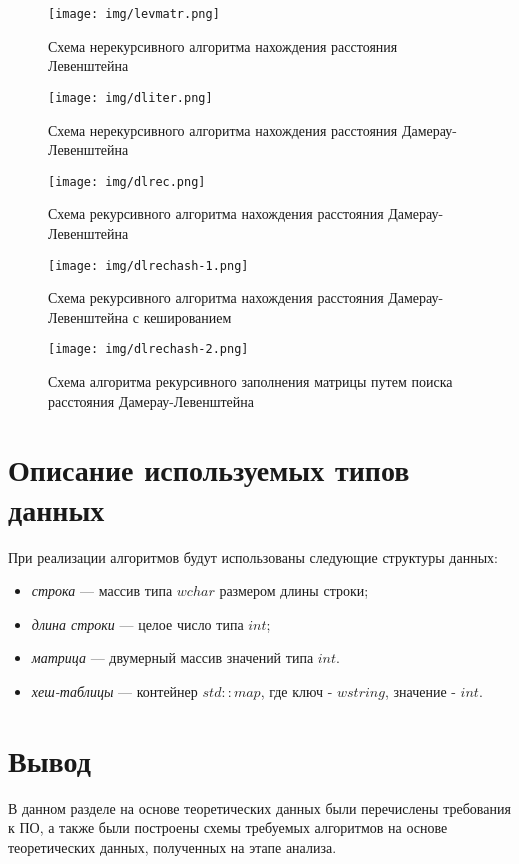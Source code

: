 \begin{figure}[h]
	\centering
	\texttt{[image: img/levmatr.png]}
	\caption{Схема нерекурсивного алгоритма нахождения расстояния Левенштейна}
	\label{fig:Liter}
\end{figure}

\clearpage

\begin{figure}[h]
	\centering
	\texttt{[image: img/dliter.png]}
	\caption{Схема нерекурсивного алгоритма нахождения расстояния Дамерау-Левенштейна}
	\label{fig:DLiter}
\end{figure}

\clearpage

\begin{figure}[h]
	\centering
	\texttt{[image: img/dlrec.png]}
	\caption{Схема рекурсивного алгоритма нахождения расстояния Дамерау-Левенштейна}
	\label{fig:DLrec}
\end{figure}

\clearpage

\begin{figure}[h]
	\centering
	\texttt{[image: img/dlrechash-1.png]}
	\caption{Схема рекурсивного алгоритма нахождения расстояния Дамерау-Левенштейна с кешированием}
	\label{fig:DLrechash1}
\end{figure}

\clearpage

\begin{figure}[h]
	\centering
	\texttt{[image: img/dlrechash-2.png]}
	\caption{Схема алгоритма рекурсивного заполнения матрицы путем поиска расстояния Дамерау-Левенштейна}
	\label{fig:DLrechash2}
\end{figure}

\clearpage

\section{Описание используемых типов данных}

При реализации алгоритмов будут использованы следующие структуры данных:

\begin{itemize}
	\item \textit{строка} --- массив типа $wchar$ размером длины строки;
	\item \textit{длина строки} --- целое число типа $int$;
	\item \textit{матрица} --- двумерный массив значений типа $int$.
        \item \textit{хеш-таблицы} --- контейнер $std::map$, где ключ - $wstring$, значение - $int$.
\end{itemize}

\section*{Вывод}

В данном разделе на основе теоретических данных были перечислены требования к ПО, а также были построены схемы требуемых алгоритмов на основе теоретических данных, полученных на этапе анализа.